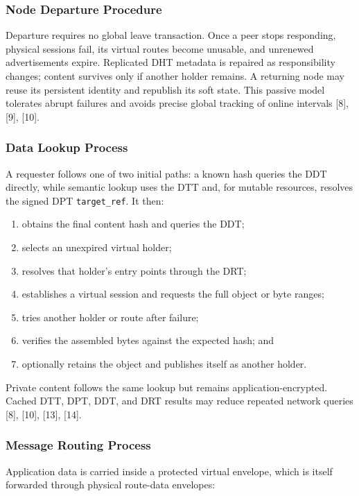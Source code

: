 \documentclass[12pt]{article}
\begin{document}
\subsubsection{Node Departure Procedure}

Departure requires no global leave transaction. Once a peer stops responding, physical
sessions fail, its virtual routes become unusable, and unrenewed advertisements expire.
Replicated DHT metadata is repaired as responsibility changes; content survives only
if another holder remains. A returning node may reuse its persistent identity and
republish its soft state. This passive model tolerates abrupt failures and avoids
precise global tracking of online intervals [8], [9], [10].

\subsubsection{Data Lookup Process}

A requester follows one of two initial paths: a known hash queries the DDT directly,
while semantic lookup uses the DTT and, for mutable resources, resolves the signed DPT
\texttt{target\_ref}. It then:

\begin{enumerate}
    \item obtains the final content hash and queries the DDT;
    \item selects an unexpired virtual holder;
    \item resolves that holder's entry points through the DRT;
    \item establishes a virtual session and requests the full object or byte ranges;
    \item tries another holder or route after failure;
    \item verifies the assembled bytes against the expected hash; and
    \item optionally retains the object and publishes itself as another holder.
\end{enumerate}

Private content follows the same lookup but remains application-encrypted. Cached DTT,
DPT, DDT, and DRT results may reduce repeated network queries [8], [10], [13], [14].

\subsubsection{Message Routing Process}

Application data is carried inside a protected virtual envelope, which is itself
forwarded through physical route-data envelopes:
\end{document}
